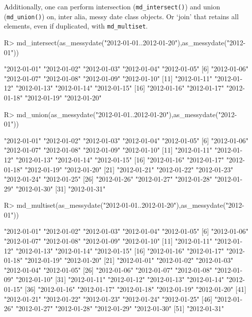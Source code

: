 \documentclass[
]{jss}
\begin{document}
Additionally, one can perform intersection (\texttt{md\_intersect()})
and union (\texttt{md\_union()}) on, inter alia, messy date class
objects. Or `join' that retains all elements, even if duplicated, with
\texttt{md\_multiset}.

\begin{CodeChunk}
\begin{CodeInput}
R> md_intersect(as_messydate("2012-01-01..2012-01-20"),as_messydate("2012-01"))
\end{CodeInput}
\begin{CodeOutput}
 [1] "2012-01-01" "2012-01-02" "2012-01-03" "2012-01-04" "2012-01-05"
 [6] "2012-01-06" "2012-01-07" "2012-01-08" "2012-01-09" "2012-01-10"
[11] "2012-01-11" "2012-01-12" "2012-01-13" "2012-01-14" "2012-01-15"
[16] "2012-01-16" "2012-01-17" "2012-01-18" "2012-01-19" "2012-01-20"
\end{CodeOutput}
\begin{CodeInput}
R> md_union(as_messydate("2012-01-01..2012-01-20"),as_messydate("2012-01"))
\end{CodeInput}
\begin{CodeOutput}
 [1] "2012-01-01" "2012-01-02" "2012-01-03" "2012-01-04" "2012-01-05"
 [6] "2012-01-06" "2012-01-07" "2012-01-08" "2012-01-09" "2012-01-10"
[11] "2012-01-11" "2012-01-12" "2012-01-13" "2012-01-14" "2012-01-15"
[16] "2012-01-16" "2012-01-17" "2012-01-18" "2012-01-19" "2012-01-20"
[21] "2012-01-21" "2012-01-22" "2012-01-23" "2012-01-24" "2012-01-25"
[26] "2012-01-26" "2012-01-27" "2012-01-28" "2012-01-29" "2012-01-30"
[31] "2012-01-31"
\end{CodeOutput}
\begin{CodeInput}
R> md_multiset(as_messydate("2012-01-01..2012-01-20"),as_messydate("2012-01"))
\end{CodeInput}
\begin{CodeOutput}
 [1] "2012-01-01" "2012-01-02" "2012-01-03" "2012-01-04" "2012-01-05"
 [6] "2012-01-06" "2012-01-07" "2012-01-08" "2012-01-09" "2012-01-10"
[11] "2012-01-11" "2012-01-12" "2012-01-13" "2012-01-14" "2012-01-15"
[16] "2012-01-16" "2012-01-17" "2012-01-18" "2012-01-19" "2012-01-20"
[21] "2012-01-01" "2012-01-02" "2012-01-03" "2012-01-04" "2012-01-05"
[26] "2012-01-06" "2012-01-07" "2012-01-08" "2012-01-09" "2012-01-10"
[31] "2012-01-11" "2012-01-12" "2012-01-13" "2012-01-14" "2012-01-15"
[36] "2012-01-16" "2012-01-17" "2012-01-18" "2012-01-19" "2012-01-20"
[41] "2012-01-21" "2012-01-22" "2012-01-23" "2012-01-24" "2012-01-25"
[46] "2012-01-26" "2012-01-27" "2012-01-28" "2012-01-29" "2012-01-30"
[51] "2012-01-31"
\end{CodeOutput}
\end{CodeChunk}

\renewcommand\refname{References}

\end{document}

